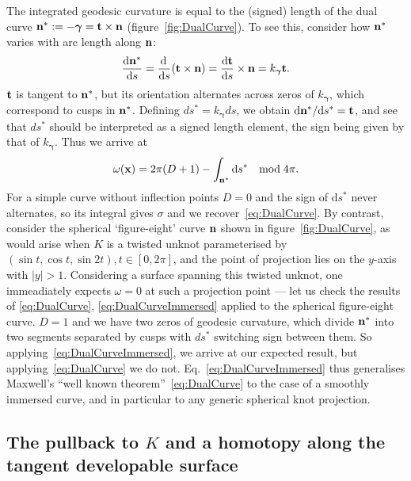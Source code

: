     The integrated geodesic curvature is equal to the (signed) length of the dual curve ${\bf n}^* := -{\boldsymbol \gamma} = {\bf t} \times {\bf n}$ \citep{Levi1994,Arnold1995}(figure~\ref{fig:DualCurve}). To see this, consider how ${\bf n}^*$ varies with arc length along ${\bf n}$:
    \begin{equation}
        \frac{\mathrm{d}{\bf n}^*}{\mathrm{d}s} = \frac{\mathrm{d}\,}{\mathrm{d}s}({\bf t} \times {\bf n}) = \frac{\mathrm{d}{\bf t}}{\mathrm{d}s} \times {\bf n}= k_{{\boldsymbol \gamma}} {\bf t} .
        \label{eq:dn*ds}
    \end{equation}
    ${\bf t}$ is tangent to ${\bf n}^*$, but its orientation alternates across zeros of $k_{\boldsymbol \gamma}$, which correspond to cusps in ${\bf n}^*$. Defining $ds^* = k_{\boldsymbol \gamma}ds$, we obtain $\mathrm{d}{\bf n}^*/\mathrm{d}s^* = {\bf t}$, and see that $ds^*$ should be interpreted as a signed length element, the sign being given by that of $k_{\boldsymbol \gamma}$. Thus we arrive at
    \begin{equation}
        \omega({\bf x}) =  2 \pi (D+1) - \int_{{\bf n}^*} \mathrm{d} s^* \quad \mathrm{mod}\; 4\pi . 
        \label{eq:DualCurveImmersed}
    \end{equation}
    For a simple curve without inflection points $D=0$ and the sign of $\mathrm{d}s^*$ never alternates, so its integral gives $\sigma$ and we recover~\eqref{eq:DualCurve}. By contrast, consider the spherical `figure-eight' curve $\bf {n}$ shown in figure~\ref{fig:DualCurve}, as would arise when $K$ is a twisted unknot parameterised by $(\sin t, \cos t, \sin 2t), t\in [0,2\pi]$, and the point of projection lies on the $y$-axis with $|y|>1$. Considering a surface spanning this twisted unknot, one immeadiately expects $\omega=0$ at such a projection point --- let us check the results of \eqref{eq:DualCurve}, \eqref{eq:DualCurveImmersed} applied to the spherical figure-eight curve. $D=1$ and we have two zeros of geodesic curvature, which divide $\bf{n}^*$ into two segments separated by cusps with $ds^*$ switching sign between them. So applying~\eqref{eq:DualCurveImmersed}, we arrive at our expected result, but applying~\eqref{eq:DualCurve} we do not. Eq.~\eqref{eq:DualCurveImmersed} thus generalises Maxwell's ``well known theorem''~\eqref{eq:DualCurve} to the case of a smoothly immersed curve, and in particular to any generic spherical knot projection. 

    \subsection{The pullback to $K$ and a homotopy along the tangent developable surface}
    \label{subsec:Pullback}

